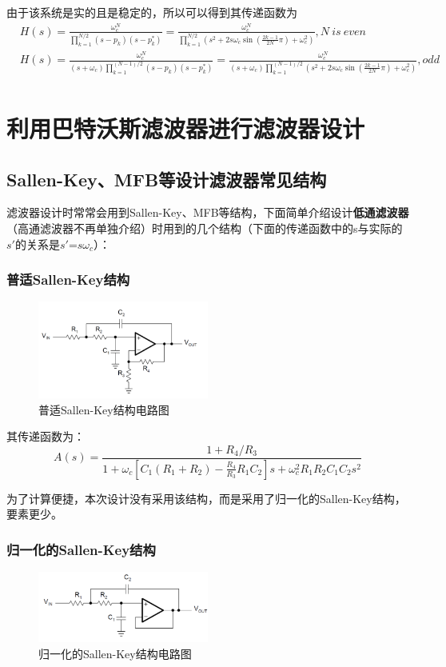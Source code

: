 \documentclass[UTF8]{ctexart}
\begin{document}
由于该系统是实的且是稳定的，所以可以得到其传递函数为
\begin{equation}
\begin{aligned}
&H(s)=\frac{\omega_c^N}{\prod^{N/2}_{k=1}(s-p_k)(s-p_k^*)}=\frac{\omega_c^N}{\prod^{N/2}_{k=1}(s^2+2s\omega_c\sin(\frac{2k-1}{2N}\pi)+\omega_c^2)},N\ is\ even\\
&H(s)=\frac{\omega_c^N}{(s+\omega_c)\prod^{(N-1)/2}_{k=1}(s-p_k)(s-p_k^*)}=\frac{\omega_c^N}{(s+\omega_c)\prod^{(N-1)/2}_{k=1}(s^2+2s\omega_c\sin(\frac{2k-1}{2N}\pi)+\omega_c^2)},odd\\
\end{aligned}
\end{equation}

\section{利用巴特沃斯滤波器进行滤波器设计}
\subsection{Sallen-Key、MFB等设计滤波器常见结构}
滤波器设计时常常会用到Sallen-Key、MFB等结构，下面简单介绍设计\textbf{低通滤波器}（高通滤波器不再单独介绍）时用到的几个结构（下面的传递函数中的s与实际的$s'$的关系是$s'$=$s\omega_c$）：
\subsubsection{普适Sallen-Key结构}
\begin{figure}[H]
\centering
\includegraphics[width=0.5\textwidth]{1.png}
\caption{普适Sallen-Key结构电路图}
\end{figure}

其传递函数为：
\begin{equation}
A(s)=\frac{1+R_4/R_3}{1+\omega_c[C_1(R_1+R_2)-\frac{R_4}{R_3}R_1C_2]s+\omega_c^2R_1R_2C_1C_2s^2}
\end{equation}

为了计算便捷，本次设计没有采用该结构，而是采用了归一化的Sallen-Key结构，要素更少。
\subsubsection{归一化的Sallen-Key结构}
\begin{figure}[H]
\centering
\includegraphics[width=0.5\textwidth]{2.png}
\caption{归一化的Sallen-Key结构电路图}
\end{figure}
\end{document}

